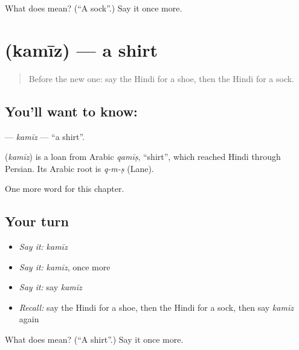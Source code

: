 \begin{tcolorbox}[breakable,colback=teal!4,colframe=teal!35!black,title={Before you move on}]
What does  mean? (\textquotedblleft{}A sock\textquotedblright{}.) Say it once more.
\end{tcolorbox}
\section[\texorpdfstring{\hi{कमीज़} (kamīz)}{कमीज़ (kamīz)}]{ (kamīz) — a shirt}

\label{lesson:HI-C135-kamiz}



\begin{quote}
Before the new one: say the Hindi for a shoe, then the Hindi for a sock.
\end{quote}

\subsection*{You'll want to know: }
\textbf{} — \emph{kamīz} — \textquotedblleft{}a shirt\textquotedblright{}.

\begin{cousinweb}
\textbf{} (\emph{kamīz}) is a loan from Arabic \emph{qamīṣ}, \textquotedblleft{}shirt\textquotedblright{}, which reached Hindi through Persian. Its Arabic root is \emph{q-m-ṣ} (Lane).
\end{cousinweb}

\begin{grammarlens}[title={What you've built}]
One more word for this chapter.
\end{grammarlens}

\subsection*{Your turn}
\begin{itemize}
\raggedright
  \item \emph{Say it:} \emph{kamīz}
  \item \emph{Say it:} \emph{kamīz}, once more
  \item \emph{Say it:} say \emph{kamīz}
  \item \emph{Recall:} say the Hindi for a shoe, then the Hindi for a sock, then say \emph{kamīz} again
\end{itemize}

\begin{tcolorbox}[breakable,colback=teal!4,colframe=teal!35!black,title={Before you move on}]
What does  mean? (\textquotedblleft{}A shirt\textquotedblright{}.) Say it once more.
\end{tcolorbox}
